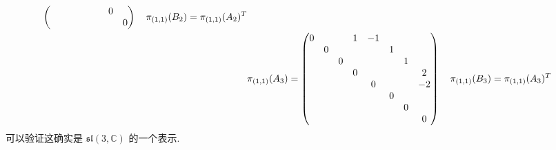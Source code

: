 \begin{itemize}
\begin{align}
\begin{pmatrix}
			& & & & & & 0 & \\
			& & & & & & & 0
		\end{pmatrix} \quad \pi_{(1, 1)}(B_2) = \pi_{(1, 1)}(A_2)^T \notag \\
		& \pi_{(1, 1)}(A_3) = \begin{pmatrix}
			0 & & & 1 & - 1 & & & \\
			& 0 & & & & 1 & & \\
			& & 0 & & & & 1 & \\
			& & & 0 & & & & 2 \\
			& & & & 0 & & & - 2 \\
			& & & & & 0 & & \\
			& & & & & & 0 & \\
			& & & & & & & 0
		\end{pmatrix} \quad \pi_{(1, 1)}(B_3) = \pi_{(1, 1)}(A_3)^T
	\end{align}
	可以验证这确实是 $\mathfrak{sl}(3, \mathbb{C})$ 的一个表示.
\end{itemize}
